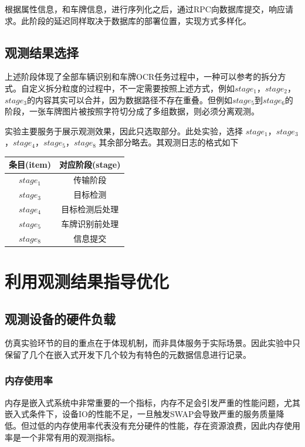 \documentclass[master,anonymous]{shtthesis}
\begin{document}
根据属性信息，和车牌信息，进行序列化之后，通过RPC向数据库提交，响应请求。此阶段的延迟同样取决于数据库的部署位置，实现方式多样化。

\subsection{观测结果选择}
上述阶段体现了全部车辆识别和车牌OCR任务过程中，一种可以参考的拆分方式。自定义拆分粒度的过程中，不一定需要按照上述方式，例如$stage_1$，$stage_2$，$stage_3$的内容其实可以合并，因为数据路径不存在重叠。但例如$stage_5$到$stage_6$的阶段，一张车牌图片被按照字符切分成了多组数据，则必须分离观测。

实验主要服务于展示观测效果，因此只选取部分。此处实验，选择
$stage_1$，$stage_3$，$stage_4$，$stage_5$，$stage_8$
其余部分略去。其观测日志的格式如下

\begin{table}[htbp]
	\centering
	\label{实验观测日志的格式}
	\begin{tabular}{cc}
		\toprule
		条目(item)  & 对应阶段(stage) \\
		\midrule
		$stage_1$  & 传输阶段  \\ 
		$stage_3$  & 目标检测 \\
		$stage_4$  & 目标检测后处理\\
		$stage_5$  & 车牌识别前处理 \\
		$stage_8$  & 信息提交\\
		\bottomrule
	\end{tabular}
\end{table}

\section{利用观测结果指导优化}
\subsection{观测设备的硬件负载}
仿真实验环节的目的重点在于体现机制，而非具体服务于实际场景。因此实验中只保留了几个在嵌入式开发下几个较为有特色的元数据信息进行记录。
\subsubsection{内存使用率}
内存是嵌入式系统中非常重要的一个指标，内存不足会引发严重的性能问题，尤其嵌入式条件下，设备IO的性能不足，一旦触发SWAP会导致严重的服务质量降低。但过低的内存使用率代表没有充分硬件的性能，存在资源浪费，因此内存使用率是一个非常有用的观测指标。
\end{document}
